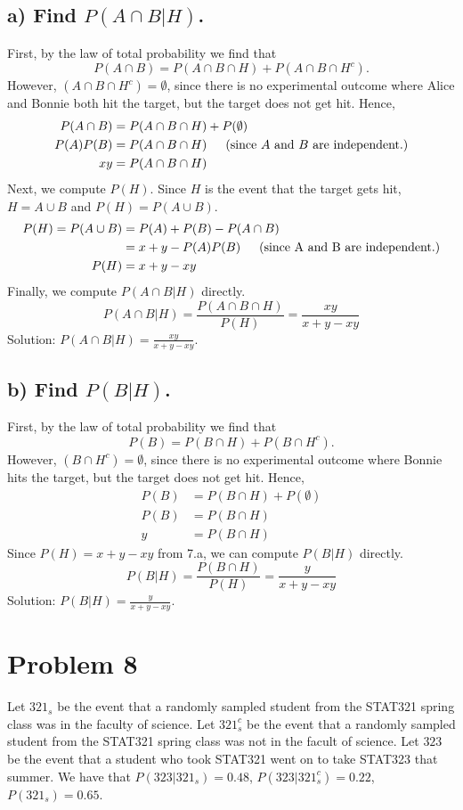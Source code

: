 \documentclass[11pt, letterpaper]{article}
\begin{document}
\subsection*{a) \normalfont Find $P(A\cap B|H)$.}
First, by the law of total probability we find that
\[P(A\cap B)=P(A\cap B\cap H)+P(A\cap B\cap H^c).\]
However, $(A\cap B\cap H^c)=\emptyset$, since there is no experimental outcome where Alice and Bonnie
both hit the target, but the target does not get hit. Hence,
\begin{align*}    
    P(A\cap B)&=P(A\cap B\cap H)+P(\emptyset)\\
    P(A)P(B)&=P(A\cap B\cap H) \text{\indent (since $A$ and $B$ are independent.)}\\
    xy&=P(A\cap B\cap H)   
\end{align*}
Next, we compute $P(H)$. Since $H$ is the event that the target gets hit, $H=A\cup B$ and $P(H)=P(A\cup B)$.
\begin{align*}
    P(H)=P(A\cup B)&=P(A)+P(B)-P(A\cap B)\\
    &=x+y-P(A)P(B) \text{\indent (since A and B are independent.)}\\
    P(H)&=x+y-xy
\end{align*}
Finally, we compute $P(A\cap B|H)$ directly.
\[P(A\cap B|H)=\frac{P(A\cap B\cap H)}{P(H)}=\frac{xy}{x+y-xy}\]
Solution: $P(A\cap B|H)=\frac{xy}{x+y-xy}$.

\subsection*{b) \normalfont Find $P(B|H)$.}
First, by the law of total probability we find that
\[P(B)=P(B\cap H)+P(B\cap H^c).\]
However, $(B\cap H^c)=\emptyset$, since there is no experimental outcome where Bonnie
hits the target, but the target does not get hit. Hence,
\begin{align*}    
    P(B)&=P(B\cap H)+P(\emptyset)\\
    P(B)&=P(B\cap H)\\
    y&=P(B\cap H)   
\end{align*}
Since $P(H)=x+y-xy$ from 7.a, we can compute $P(B|H)$ directly.
\[P(B|H)=\frac{P(B\cap H)}{P(H)}=\frac{y}{x+y-xy}\]
Solution: $P(B|H)=\frac{y}{x+y-xy}$.

\section*{Problem 8}
Let $321_s$ be the event that a randomly sampled student from the STAT321 spring class was in the faculty
of science. Let $321_s^c$ be the event that a randomly sampled student from the STAT321 spring class was not
in the facult of science. Let $323$ be the event that a student who took STAT321 went on to take STAT323 that summer.
We have that $P(323|321_s)=0.48$, $P(323|321_s^c)=0.22$, $P(321_s)=0.65$. 
\end{document}
